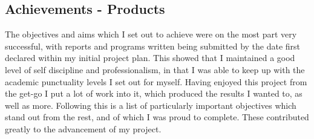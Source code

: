 \documentclass[a4paper, 11pt]{article}
\begin{document}
\subsection{Achievements - Products}
The objectives and aims which I set out to achieve were on the most part very successful, with reports and programs written being submitted by the date first declared within my initial project plan. This showed that I maintained a good level of self discipline and professionalism, in that I was able to keep up with the academic punctuality levels I set out for myself. Having enjoyed this project from the get-go I put a lot of work into it, which produced the results I wanted to, as well as more. Following this is a list of particularly important objectives which stand out from the rest, and of which I was proud to complete. These contributed greatly to the advancement of my project.
%
\end{document}
